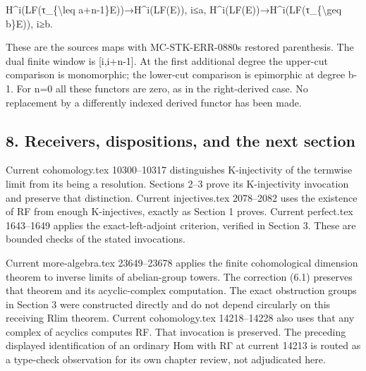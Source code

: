 \documentclass[11pt]{article}
\begin{document}
H\textasciicircum{}i(LF(τ\_\allowbreak{}\{\textbackslash{}leq a\allowbreak{}+n-1\}E)\allowbreak{})\allowbreak{}\allowbreak{}→H\textasciicircum{}i(LF(E)\allowbreak{})\allowbreak{},\allowbreak{} i≤a,\allowbreak{} H\textasciicircum{}i(LF(E)\allowbreak{})\allowbreak{}\allowbreak{}→H\textasciicircum{}i(LF(τ\_\allowbreak{}\{\textbackslash{}geq b\}E)\allowbreak{})\allowbreak{},\allowbreak{} i≥b.

These are the source\textquotesingle s maps with MC-STK-ERR-0880\textquotesingle s restored parenthesis. The dual finite window is [i,\allowbreak{}i\allowbreak{}+n-1]\allowbreak{}. At the first additional degree the upper-cut comparison is monomorphic; the lower-cut comparison is epimorphic at degree b-1. For n\allowbreak{}=0 all these functors are zero,\allowbreak{} as in the right-derived case. No replacement by a differently indexed derived functor has been made.

\subsection{\texorpdfstring{8. Receivers,\allowbreak{} dispositions,\allowbreak{} and the next section}{8.   and the next section}}\label{proofs-9746-10132-receivers-dispositions-and-the-next-section}

Current cohomology.tex 10300–\allowbreak{}10317 distinguishes K-injectivity of the termwise limit from its being a resolution. Sections 2–\allowbreak{}3 prove its K-injectivity invocation and preserve that distinction. Current injectives.tex 2078–\allowbreak{}2082 uses the existence of RF from enough K-injectives,\allowbreak{} exactly as Section 1 proves. Current perfect.tex 1643–\allowbreak{}1649 applies the exact-left-adjoint criterion,\allowbreak{} verified in Section 3. These are bounded checks of the stated invocations.

Current more-algebra.tex 23649–\allowbreak{}23678 applies the finite cohomological dimension theorem to inverse limits of abelian-group towers. The correction (6.1)\allowbreak{} preserves that theorem and its acyclic-complex computation. The exact obstruction groups in Section 3 were constructed directly and do not depend circularly on this receiving Rlim theorem. Current cohomology.tex 14218–\allowbreak{}14228 also uses that any complex of acyclics computes RF. That invocation is preserved. The preceding displayed identification of an ordinary Hom with RΓ at current 14213 is routed as a type-check observation for its own chapter review,\allowbreak{} not adjudicated here.
\end{document}
